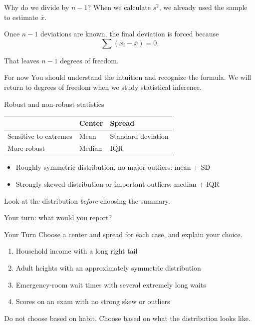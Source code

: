 \documentclass[11pt,aspectratio=169]{beamer}
\newcommand{\yourturn}[1]{%
\begin{center}
\begin{minipage}{0.90\textwidth}
\begin{alertblock}{Your Turn}
#1
\end{alertblock}
\end{minipage}
\end{center}}
\begin{document}
\begin{frame}{Why do we divide by $n-1$?}
When we calculate $s^2$, we already used the sample to estimate $\bar{x}$.

\vspace{0.6em}
Once $n-1$ deviations are known, the final deviation is forced because
\[
\sum (x_i-\bar{x})=0.
\]

That leaves \alert{$n-1$ degrees of freedom}.

\vfill
\begin{block}{For now}
You should understand the intuition and recognize the formula. We will return to degrees of freedom when we study statistical inference.
\end{block}
\end{frame}

\begin{frame}{Robust and non-robust statistics}
\begin{center}
\renewcommand{\arraystretch}{1.4}
\begin{tabular}{lll}
\toprule
 & \textbf{Center} & \textbf{Spread} \\
\midrule
Sensitive to extremes & Mean & Standard deviation \\
More robust & Median & IQR \\
\bottomrule
\end{tabular}
\end{center}

\vspace{0.8em}
\begin{itemize}
  \item Roughly symmetric distribution, no major outliers: \alert{mean + SD}
  \item Strongly skewed distribution or important outliers: \alert{median + IQR}
\end{itemize}

\vfill
\begin{center}
\Large Look at the distribution \emph{before} choosing the summary.
\end{center}
\end{frame}

\begin{frame}{Your turn: what would you report?}
\yourturn{Choose a center and spread for each case, and explain your choice.
\begin{enumerate}
  \item Household income with a long right tail
  \item Adult heights with an approximately symmetric distribution
  \item Emergency-room wait times with several extremely long waits
  \item Scores on an exam with no strong skew or outliers
\end{enumerate}}

\vfill
\small
Do not choose based on habit. Choose based on what the distribution looks like.
\end{frame}
\end{document}
